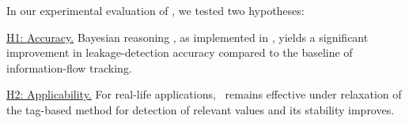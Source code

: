 In our experimental evaluation of \Tool, we tested two hypotheses:
\begin{compactenum}
\item \underline{H1: Accuracy.}
    Bayesian reasoning , as implemented in \Tool,
     yields a significant improvement in leakage-detection accuracy compared to the baseline of information-flow tracking.
\item \underline{H2: Applicability.} For real-life applications, \Tool\ remains effective under relaxation of the 
     tag-based method for detection of relevant values and its stability improves.
\end{compactenum}








